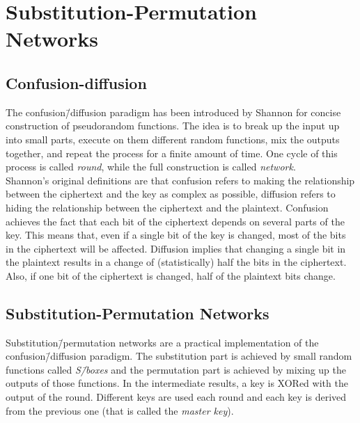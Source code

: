 \section{Substitution-Permutation Networks}
\subsection{Confusion-diffusion}
The confusion\=/diffusion paradigm has been introduced by Shannon for concise construction of pseudorandom functions. The idea is to break up the input up into small parts, execute on them different random functions, mix the outputs together, and repeat the process for a finite amount of time. One cycle of this process is called \emph{round}, while the full construction is called \emph{network}.\\
Shannon's original definitions are that confusion refers to making the relationship between the ciphertext and the key as complex as possible, diffusion refers to hiding the relationship between the ciphertext and the plaintext.
Confusion achieves the fact that each bit of the ciphertext depends on several parts of the key. This means that, even if a single bit of the key is changed, most of the bits in the ciphertext will be affected.
Diffusion implies that changing a single bit in the plaintext results in a change of (statistically) half the bits in the ciphertext. Also, if one bit of the ciphertext is changed, half of the plaintext bits change.

\subsection{Substitution-Permutation Networks}
Substitution\=/permutation networks are a practical implementation of the confusion\=/diffusion paradigm. The substitution part is achieved by small random functions called \emph{S\=/boxes} and the permutation part is achieved by mixing up the outputs of those functions. In the intermediate results, a key is XORed with the output of the round. Different keys are used each round and each key is derived from the previous one (that is called the \emph{master key}).
